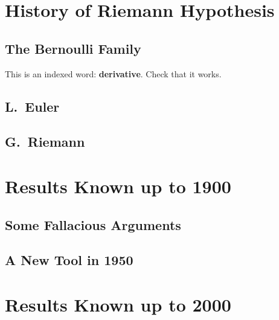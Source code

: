

\renewcommand\AUTHOR{John Doe}
\renewcommand\SHORTAUTHOR{J.\ Doe}
\renewcommand\TITLE{Riemann Hypothesis}
\renewcommand\ADVISOR{Dr.\ C.\ F.\ Gauss}


\topmatter

\chapter{History of Riemann Hypothesis}

\section{The Bernoulli Family}
\lipsum[1-3]

This is an indexed word: 
{\bf derivative}. 
Check that it works.

\section{L.~Euler}
\lipsum[4-5]

\section{G.~Riemann}
\lipsum[5-8]

\chapter{Results Known up to 1900}

\section{Some Fallacious Arguments}

\lipsum[1-3]

\begin{thm}
\lipsum[4]
\end{thm}

\lipsum[5-6]

\section{A New Tool in 1950}

\lipsum[6-7]

\chapter{Results Known up to 2000}

